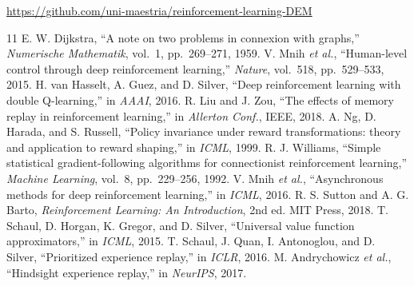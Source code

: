 \documentclass[conference]{IEEEtran}
\begin{document}
\url{https://github.com/uni-maestria/reinforcement-learning-DEM}

\begin{thebibliography}{11}
 E. W. Dijkstra, ``A note on two problems in connexion with
graphs,'' \emph{Numerische Mathematik}, vol.~1, pp.~269--271, 1959.
 V. Mnih \emph{et al.}, ``Human-level control through deep
reinforcement learning,'' \emph{Nature}, vol.~518, pp.~529--533, 2015.
 H. van Hasselt, A. Guez, and D. Silver, ``Deep
reinforcement learning with double Q-learning,'' in \emph{AAAI}, 2016.
 R. Liu and J. Zou, ``The effects of memory replay in
reinforcement learning,'' in \emph{Allerton Conf.}, IEEE, 2018.
 A. Ng, D. Harada, and S. Russell, ``Policy invariance under reward
transformations: theory and application to reward shaping,'' in \emph{ICML}, 1999.
 R. J. Williams, ``Simple statistical gradient-following
algorithms for connectionist reinforcement learning,'' \emph{Machine Learning},
vol.~8, pp.~229--256, 1992.
 V. Mnih \emph{et al.}, ``Asynchronous methods for deep
reinforcement learning,'' in \emph{ICML}, 2016.
 R. S. Sutton and A. G. Barto, \emph{Reinforcement Learning: An
Introduction}, 2nd ed. MIT Press, 2018.
 T. Schaul, D. Horgan, K. Gregor, and D. Silver, ``Universal
value function approximators,'' in \emph{ICML}, 2015.
 T. Schaul, J. Quan, I. Antonoglou, and D. Silver, ``Prioritized
experience replay,'' in \emph{ICLR}, 2016.
 M. Andrychowicz \emph{et al.}, ``Hindsight experience
replay,'' in \emph{NeurIPS}, 2017.
\end{thebibliography}

% 
\end{document}
